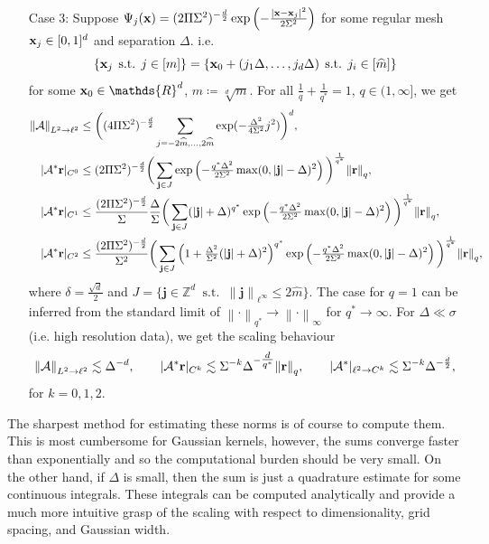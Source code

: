 \documentclass[10pt,a4paper,onecolumn]{article} \usepackage[latin1]{inputenc}
\numberwithin{equation}{section}
\let\F\mathds\let\C\mathcal\newcommand{\R}{\F{R}}\newcommand{\A}{\C{A}}
\newcommand{\norm}[1]{{\left\lVert #1 \right\rVert}}
\DeclareMathOperator{\st}{\;s.t.\;}\DeclareMathOperator{\as}{\;a.s.\;}\renewcommand{\epsilon}{\varepsilon}
\renewcommand{\vec}{\mathbf}
\newcommand{\UCmath}[1]{%
	\begingroup
	\ucmathlist\uppercase\expandafter{#1}%
	\endgroup
}
\newcommand{\ucmathlist}{%
	\def\alpha{\mathrm{A}}%
	\def\beta{\mathrm{B}}%
	\let\gamma=\Gamma
	\let\delta=\Delta
	\def\epsilon{\mathrm{E}}%
	\def\varepsilon{\mathrm{E}}%
	\def\zeta{\mathrm{Z}}%
	\def\eta{\mathrm{H}}%
	\let\theta=\Theta
	\let\vartheta=\Theta
	\def\iota{\mathrm{I}}%
	\def\kappa{\mathrm{K}}%
	\let\lambda=\Lambda
	\def\mu{\mathrm{M}}%
	\def\nu{\mathrm{N}}%
	\let\xi=\Xi
	\let\pi=\Pi
	\let\varpi=\Pi
	\def\rho{\mathrm{P}}%
	\def\varrho{\mathrm{P}}%
	\let\sigma=\Sigma
	\def\tau{\mathrm{T}}%
	\let\upsilon=\Upsilon
	\let\phi=\Phi
	\let\varphi=\Phi
	\def\chi{\mathrm{X}}%
	\let\psi=\Psi
	\let\omega=\Omega
}
\newcommand{\caps}[1]{\UCmath{#1}}
\newcommand*{\vard}[1]{%
	\IfEqCase{#1}{%
		{0}{\varphi}%
		{1}{\psi}%
	}[\varphi #1]%
}
\newcommand*{\varx}[1]{%
	\IfEqCase{#1}{%
		{0}{x}%
		{1}{y}%
		{2}{z}%
		{3}{r}%
	}[x#1]%
}
\newcommand*{\Varx}[1]{\caps{\varx{#1}}}
\newcommand*{\vvarx}[1]{\vec{\varx{#1}}}\newcommand*{\vVarx}[1]{\vec{\Varx{#1}}}
\begin{document}
\begin{theorem}
{\begin{enumerate}
			\item[Case 3:] Suppose $\vard1_j(\vvarx0) = (2\pi\sigma^2)^{-\frac{d}{2}}\exp\left(-\frac{|\vvarx0-\vvarx0_j|^2}{2\sigma^2}\right)$ for some regular mesh $\vvarx0_j\in[0,1]^d$ and separation $\Delta$. i.e. 
			$$\{\vvarx0_j\st j\in[m]\} = \{\vvarx0_0 + (j_1\Delta,\ldots,j_d\Delta)\st j_i\in[\hat m]\}$$
			for some $\vvarx0_0\in\R^d$, $\hat m\coloneqq\sqrt[d]{m}$. For all $\frac1q + \frac{1}{q^*} = 1$, $q\in(1,\infty]$, we get
			\begin{align*}
				\norm{\A}_{L^2\to\ell^2} &\leq \bigg((4\pi\sigma^2)^{-\frac d2}\sum_{j=-2\hat m,\ldots,2\hat m}\exp(-\tfrac{\Delta^2}{4\sigma^2}j^2)\bigg)^d,
				\\ |\A^*\vvarx3|_{C^0} &\leq (2\pi\sigma^2)^{-\frac{d}{2}}\bigg(\sum_{\vec j\in J}\exp\left(-\tfrac{q^*\Delta^2}{2\sigma^2}\max(0,|\vec j|-\delta)^2\right)\bigg)^{\frac1{q^*}}\norm{\vvarx3}_q,
				\\ |\A^*\vvarx3|_{C^1} &\leq \frac{(2\pi\sigma^2)^{-\frac{d}{2}}}{\sigma}\frac{\Delta}{\sigma}\bigg(\sum_{\vec j\in J}(|\vec j|+\delta)^{q^*}\exp\left(-\tfrac{q^*\Delta^2}{2\sigma^2}\max(0,|\vec j|-\delta)^2\right)\bigg)^{\frac1{q^*}}\norm{\vvarx3}_q,
				\\ |\A^*\vvarx3|_{C^2} &\leq \frac{(2\pi\sigma^2)^{-\frac{d}{2}}}{\sigma^2} \bigg(\sum_{\vec j\in J} \left(1+\tfrac{\Delta^2}{\sigma^2}(|\vec j|+\delta)^2\right)^{q^*}\exp\left(-\tfrac{q^*\Delta^2}{2\sigma^2}\max(0,|\vec j|-\delta)^2\right)\bigg)^{\frac1{q^*}} \norm{\vvarx3}_q,
			\end{align*}
			where $\delta= \frac{\sqrt d}{2}$ and $J=\{\vec j\in\F Z^d \st \norm{\vec j}_{\ell^\infty}\leq 2\hat m\}$. The case for $q=1$ can be inferred from the standard limit of $\norm\cdot_{{q^*}}\to \norm\cdot_{\infty}$ for $q^*\to\infty$. For $\Delta\ll\sigma$ (i.e. high resolution data), we get the scaling behaviour
			$$ \norm{\A}_{L^2\to\ell^2} \lesssim \Delta^{-d}, \qquad |\A^*\vvarx3|_{C^k} \lesssim \sigma^{-k}\Delta^{-\tfrac{d}{q^*}}\norm{\vvarx3}_q, \qquad |\A^*|_{\ell^2\to C^k} \lesssim \sigma^{-k}\Delta^{-\frac{d}{2}},$$
			for $k=0,1,2$.
		\end{enumerate}
	}
\end{theorem}

The sharpest method for estimating these norms is of course to compute them. This is most cumbersome for Gaussian kernels, however, the sums converge faster than exponentially and so the computational burden should be very small. On the other hand, if $\Delta$ is small, then the sum is just a quadrature estimate for some continuous integrals. These integrals can be computed analytically and provide a much more intuitive grasp of the scaling with respect to dimensionality, grid spacing, and Gaussian width.
\end{document}
